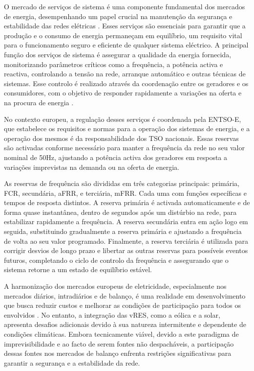 
O mercado de serviços de sistema é uma componente fundamental dos mercados de energia, desempenhando um papel crucial na manutenção da segurança e estabilidade das redes elétricas \cite{dgegmss}. Esses serviços são essenciais para garantir que a produção e o consumo de energia permaneçam em equilíbrio, um requisito vital para o funcionamento seguro e eficiente de qualquer sistema eléctrico. A principal função dos serviços de sistema é assegurar a qualidade da energia fornecida, monitorizando parâmetros críticos como a frequência, a potência activa e reactiva, controlando a tensão na rede, arranque automático e outras técnicas de sistemas. Esse controlo é realizado através da coordenação entre os geradores e os consumidores, com o objetivo de responder rapidamente a variações na oferta e na procura de energia \cite{Rassid2017} \cite{Carneiro2016}.\par
No contexto europeu, a regulação desses serviços é coordenada pela \gls{ENTSO-E}, que estabelece os requisitos e normas para a operação dos sistemas de energia, e a operação dos mesmos é da responsabilidade dos \gls{TSO} nacionais. Essas reservas são activadas conforme necessário para manter a frequência da rede no seu valor nominal de 50Hz, ajustando a potência activa dos geradores em resposta a variações imprevistas na demanda ou na oferta de energia.\par
As reservas de frequência são divididas em três categorias principais: primária, \gls{FCR}, secundária, \gls{aFRR}, e terciária, \gls{mFRR}. Cada uma com funções específicas e tempos de resposta distintos. A reserva primária é activada automaticamente e de forma quase instantânea, dentro de segundos após um distúrbio na rede, para estabilizar rapidamente a frequência. A reserva secundária entra em ação logo em seguida, substituindo gradualmente a reserva primária e ajustando a frequência de volta ao seu valor programado. Finalmente, a reserva terciária é utilizada para corrigir desvios de longo prazo e libertar as outras reservas para possíveis eventos futuros, completando o ciclo de controlo da frequência e assegurando que o sistema retorne a um estado de equilíbrio estável.\par
A harmonização dos mercados europeus de eletricidade, especialmente nos mercados diários, intradiários e de balanço, é uma realidade em desenvolvimento que busca reduzir custos e melhorar as condições de participação para todos os envolvidos \cite{Algarvio2019}. No entanto, a integração das \gls{vRES}, como a eólica e a solar, apresenta desafios adicionais devido à sua natureza intermitente e dependente de condições climáticas. Embora tecnicamente viável, devido a este paradigma de imprevisibilidade e ao facto de serem fontes não despacháveis, a participação dessas fontes nos mercados de balanço enfrenta restrições significativas para garantir a segurança e a estabilidade da rede.\par

